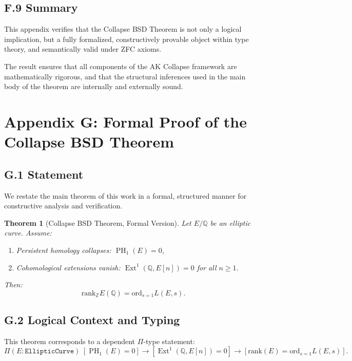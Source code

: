 \documentclass[11pt]{article}
\newtheorem{theorem}{Theorem}[section]
\DeclareMathOperator{\Ext}{Ext}
\DeclareMathOperator{\PH}{PH}
\newcommand{\QQ}{\mathbb{Q}}
\newcommand{\ZZ}{\mathbb{Z}}
\begin{document}
\subsection*{F.9 Summary}

This appendix verifies that the Collapse BSD Theorem is not only a logical implication,  
but a fully formalized, constructively provable object within type theory, and semantically valid under ZFC axioms.

The result ensures that all components of the AK Collapse framework are mathematically rigorous, and that the structural inferences used in the main body of the theorem are internally and externally sound.



\section*{Appendix G: Formal Proof of the Collapse BSD Theorem}

\subsection*{G.1 Statement}

We restate the main theorem of this work in a formal, structured manner for constructive analysis and verification.

\begin{theorem}[Collapse BSD Theorem, Formal Version]
\label{thm:collapse-bsd-formal}
Let $E/\QQ$ be an elliptic curve. Assume:
\begin{enumerate}
  \item[\textbf{(A)}] Persistent homology collapses: $\PH_1(E) = 0$,
  \item[\textbf{(B)}] Cohomological extensions vanish: $\Ext^1(\QQ, E[n]) = 0$ for all $n \geq 1$.
\end{enumerate}

Then:
\[
\mathrm{rank}_{\ZZ} E(\QQ) = \mathrm{ord}_{s=1} L(E,s).
\]
\end{theorem}

\subsection*{G.2 Logical Context and Typing}

This theorem corresponds to a dependent $\Pi$-type statement:
\[
\Pi (E : \texttt{EllipticCurve})\;
[\PH_1(E) = 0] \to [\Ext^1(\QQ,E[n]) = 0] \to [\mathrm{rank}(E) = \mathrm{ord}_{s=1} L(E,s)].
\]
\end{document}
